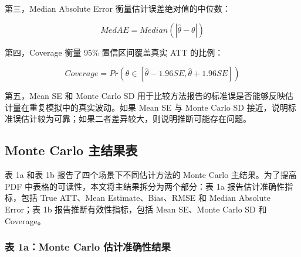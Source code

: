 \documentclass[
  fontset=windows]{ctexart}
\begin{document}
第三，Median Absolute Error 衡量估计误差绝对值的中位数：

\[
MedAE = Median(|\hat{\theta}-\theta|)
\]

第四，Coverage 衡量 95\% 置信区间覆盖真实 ATT 的比例：

\[
Coverage = Pr(\theta \in [\hat{\theta}-1.96SE,\hat{\theta}+1.96SE])
\]

第五，Mean SE 和 Monte Carlo SD
用于比较方法报告的标准误是否能够反映估计量在重复模拟中的真实波动。如果
Mean SE 与 Monte Carlo SD
接近，说明标准误估计较为可靠；如果二者差异较大，则说明推断可能存在问题。

\subsection{Monte Carlo
主结果表}\label{monte-carlo-ux4e3bux7ed3ux679cux8868}

表 1a 和表 1b 报告了四个场景下不同估计方法的 Monte Carlo
主结果。为了提高 PDF 中表格的可读性，本文将主结果拆分为两个部分：表 1a
报告估计准确性指标，包括 True ATT、Mean Estimate、Bias、RMSE 和 Median
Absolute Error；表 1b 报告推断有效性指标，包括 Mean SE、Monte Carlo SD
和 Coverage。

\subsubsection{表 1a：Monte Carlo
估计准确性结果}\label{ux8868-1amonte-carlo-ux4f30ux8ba1ux51c6ux786eux6027ux7ed3ux679c}
\end{document}
